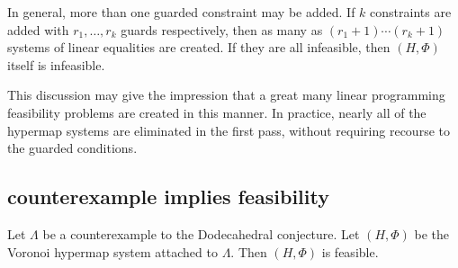 In general, more than one guarded constraint may be added.  If
$k$ constraints are added with $r_1,\ldots,r_k$ guards
respectively, then as many as $(r_1+1)\cdots (r_k+1)$ systems
of linear equalities are created.  If they are all infeasible,
then $(H,\Phi)$ itself is infeasible.

This discussion may give the impression 
that a great many linear programming feasibility
problems are created in this manner.  In practice, nearly all
of the hypermap systems are eliminated in the first pass, without
requiring recourse to the guarded conditions.  



\subsection{counterexample implies feasibility}

\begin{theorem}\label{thm:feasible}  Let $\Lambda$ be a counterexample to the Dodecahedral conjecture.  Let $(H,\Phi)$ be the Voronoi hypermap system attached to $\Lambda$.
Then $(H,\Phi)$ is feasible.
\end{theorem}

